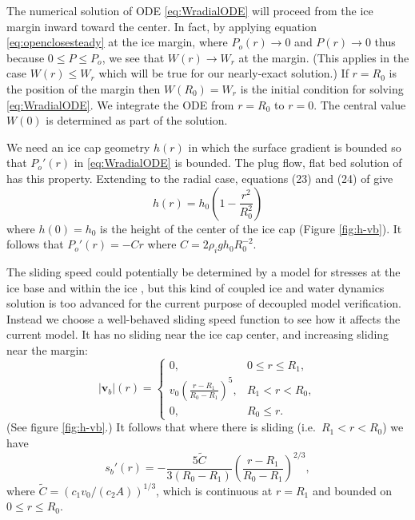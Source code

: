 \documentclass[11pt,final]{amsart}%
\newcommand\bv{\mathbf{v}}
\begin{document}
The numerical solution of ODE \eqref{eq:WradialODE} will proceed from the ice margin inward toward the center.  In fact, by applying equation \eqref{eq:openclosesteady} at the ice margin, where $P_o(r)\to 0$ and $P(r)\to 0$ thus because $0 \le P \le P_o$, we see that $W(r)\to W_r$ at the margin.  (This applies in the case $W(r)\le W_r$ which will be true for our nearly-exact solution.)  If $r=R_0$ is the position of the margin then $W(R_0)=W_r$ is the initial condition for solving \eqref{eq:WradialODE}.  We integrate the ODE from $r=R_0$ to $r=0$.  The central value $W(0)$ is determined as part of the solution.

We need an ice cap geometry $h(r)$ in which the surface gradient is bounded so that $P_o'(r)$ in \eqref{eq:WradialODE} is bounded.  The plug flow, flat bed solution of \cite{Bodvardsson} has this property.  Extending to the radial case, equations (23) and (24) of \citep{Bodvardsson} give
\begin{equation}
h(r) = h_0 \left(1 - \frac{r^2}{R_0^2} \right) \label{eq:choosebodvardssonh}
\end{equation}
where $h(0)=h_0$ is the height of the center of the ice cap (Figure \ref{fig:h-vb}).  It follows that $P_o'(r) = - C r$ where $C=2\rho_i g h_0 R_0^{-2}$.

The sliding speed could potentially be determined by a model for stresses at the ice base and within the ice \citep{Bodvardsson,GreveBlatter2009}, but this kind of coupled ice and water dynamics solution is too advanced for the current purpose of decoupled model verification.  Instead we choose a well-behaved sliding speed function to see how it affects the current model.  It has no sliding near the ice cap center, and increasing sliding near the margin:
\begin{equation}
|\bv_b|(r) = \begin{cases} 0, & 0 \le r \le R_1, \\
                           v_0  \left(\frac{r-R_1}{R_0-R_1}\right)^5, & R_1 < r < R_0, \\
                           0, & R_0 \le r.
             \end{cases}  \label{eq:choosevb}
\end{equation}
(See figure \ref{fig:h-vb}.)  It follows that where there is sliding (i.e.~$R_1 < r < R_0$) we have
\begin{equation}
s_b'(r) = - \frac{5 \tilde C}{3 (R_0-R_1)} \left(\frac{r-R_1}{R_0-R_1}\right)^{2/3}, \label{eq:determinessbprime}
\end{equation}
where $\tilde C = (c_1 v_0/(c_2 A))^{1/3}$, which is continuous at $r=R_1$ and bounded on $0\le r \le R_0$.
\end{document}
